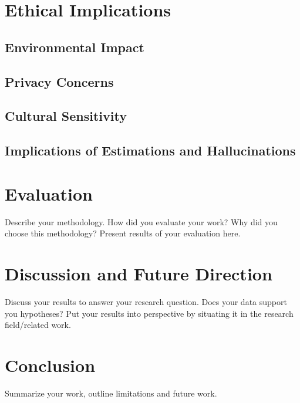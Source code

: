 \section{Ethical Implications}

\subsection{Environmental Impact}

\subsection{Privacy Concerns}

\subsection{Cultural Sensitivity}

\subsection{Implications of Estimations and Hallucinations}


\section{Evaluation}
Describe your methodology. How did you evaluate your work? Why did you choose this methodology? Present results of your evaluation here.

\section{Discussion and Future Direction}
Discuss your results to answer your research question. Does your data support you hypotheses? Put your results into perspective by situating it in the research field/related work.

\section{Conclusion}
Summarize your work, outline limitations and future work.

